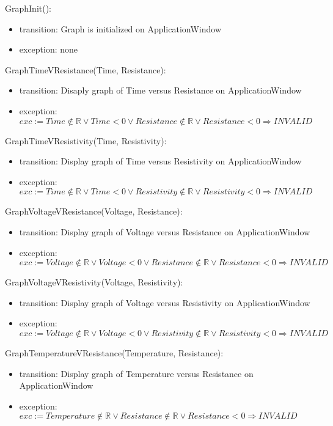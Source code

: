 \documentclass[12pt, titlepage]{article}
\begin{document}
\noindent GraphInit():
\begin{itemize}
\item transition: Graph is initialized on ApplicationWindow
\item exception: none
\end{itemize}

\noindent GraphTimeVResistance(Time, Resistance):
\begin{itemize}
\item transition: Disaply graph of Time versus Resistance on ApplicationWindow 
\item exception: $exc:= Time \notin  \mathbb{R} \lor Time < 0 \lor  Resistance \notin  \mathbb{R} \lor Resistance < 0\Rightarrow INVALID$
\end{itemize}

\noindent GraphTimeVResistivity(Time, Resistivity):
\begin{itemize}
\item transition: Display graph of Time versus Resistivity on ApplicationWindow
\item exception: $exc:= Time \notin  \mathbb{R} \lor Time < 0 \lor  Resistivity \notin  \mathbb{R} \lor Resistivity < 0\Rightarrow INVALID$
\end{itemize}

\noindent GraphVoltageVResistance(Voltage, Resistance):
\begin{itemize}
\item transition: Display graph of Voltage versus Resistance on ApplicationWindow
\item exception: $exc:= Voltage\notin  \mathbb{R} \lor Voltage < 0 \lor  Resistance \notin  \mathbb{R} \lor Resistance < 0\Rightarrow INVALID$
\end{itemize}

\noindent GraphVoltageVResistivity(Voltage, Resistivity):
\begin{itemize}
\item transition: Display graph of Voltage versus Resistivity on ApplicationWindow
\item exception: $exc:= Voltage \notin  \mathbb{R} \lor Voltage < 0 \lor  Resistivity \notin  \mathbb{R} \lor Resistivity< 0\Rightarrow INVALID$
\end{itemize}

\noindent GraphTemperatureVResistance(Temperature, Resistance):
\begin{itemize}
\item transition: Display graph of Temperature versus Resistance on ApplicationWindow
\item exception: $exc:= Temperature \notin  \mathbb{R} \lor  Resistance \notin  \mathbb{R} \lor Resistance < 0\Rightarrow INVALID$
\end{itemize}
\end{document}
